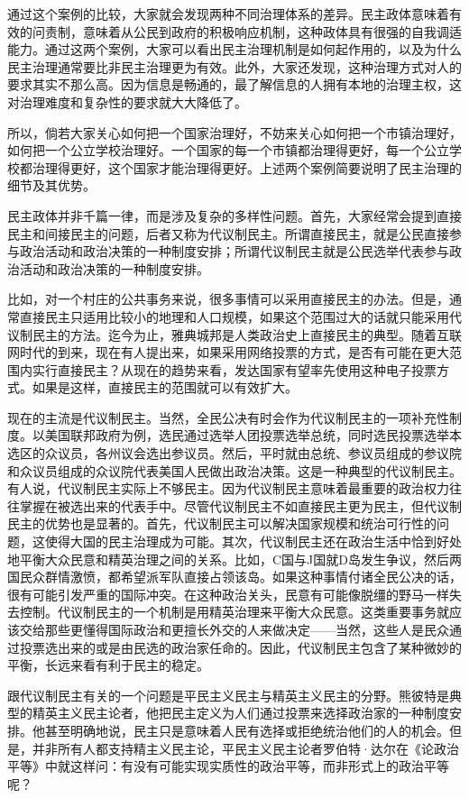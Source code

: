 通过这个案例的比较，大家就会发现两种不同治理体系的差异。民主政体意味着有效的问责制，意味着从公民到政府的积极响应机制，这种政体具有很强的自我调适能力。通过这两个案例，大家可以看出民主治理机制是如何起作用的，以及为什么民主治理通常要比非民主治理更为有效。此外，大家还发现，这种治理方式对人的要求其实不那么高。因为信息是畅通的，最了解信息的人拥有本地的治理主权，这对治理难度和复杂性的要求就大大降低了。

所以，倘若大家关心如何把一个国家治理好，不妨来关心如何把一个市镇治理好，如何把一个公立学校治理好。一个国家的每一个市镇都治理得更好，每一个公立学校都治理得更好，这个国家才能治理得更好。上述两个案例简要说明了民主治理的细节及其优势。


民主政体并非千篇一律，而是涉及复杂的多样性问题。首先，大家经常会提到直接民主和间接民主的问题，后者又称为代议制民主。所谓直接民主，就是公民直接参与政治活动和政治决策的一种制度安排；所谓代议制民主就是公民选举代表参与政治活动和政治决策的一种制度安排。

比如，对一个村庄的公共事务来说，很多事情可以采用直接民主的办法。但是，通常直接民主只适用比较小的地理和人口规模，如果这个范围过大的话就只能采用代议制民主的方法。迄今为止，雅典城邦是人类政治史上直接民主的典型。随着互联网时代的到来，现在有人提出来，如果采用网络投票的方式，是否有可能在更大范围内实行直接民主？从现在的趋势来看，发达国家有望率先使用这种电子投票方式。如果是这样，直接民主的范围就可以有效扩大。

现在的主流是代议制民主。当然，全民公决有时会作为代议制民主的一项补充性制度。以美国联邦政府为例，选民通过选举人团投票选举总统，同时选民投票选举本选区的众议员，各州议会选出参议员。然后，平时就由总统、参议员组成的参议院和众议员组成的众议院代表美国人民做出政治决策。这是一种典型的代议制民主。有人说，代议制民主实际上不够民主。因为代议制民主意味着最重要的政治权力往往掌握在被选出来的代表手中。尽管代议制民主不如直接民主更为民主，但代议制民主的优势也是显著的。首先，代议制民主可以解决国家规模和统治可行性的问题，这使得大国的民主治理成为可能。其次，代议制民主还在政治生活中恰到好处地平衡大众民意和精英治理之间的关系。比如，C国与J国就D岛发生争议，然后两国民众群情激愤，都希望派军队直接占领该岛。如果这种事情付诸全民公决的话，很有可能引发严重的国际冲突。在这种政治关头，民意有可能像脱缰的野马一样失去控制。代议制民主的一个机制是用精英治理来平衡大众民意。这类重要事务就应该交给那些更懂得国际政治和更擅长外交的人来做决定——当然，这些人是民众通过投票选出来的或是由民选的政治家任命的。因此，代议制民主包含了某种微妙的平衡，长远来看有利于民主的稳定。

跟代议制民主有关的一个问题是平民主义民主与精英主义民主的分野。熊彼特是典型的精英主义民主论者，他把民主定义为人们通过投票来选择政治家的一种制度安排。他甚至明确地说，民主只是意味着人民有选择或拒绝统治他们的人的机会。但是，并非所有人都支持精主义民主论，平民主义民主论者罗伯特·达尔在《论政治平等》中就这样问：有没有可能实现实质性的政治平等，而非形式上的政治平等呢？

